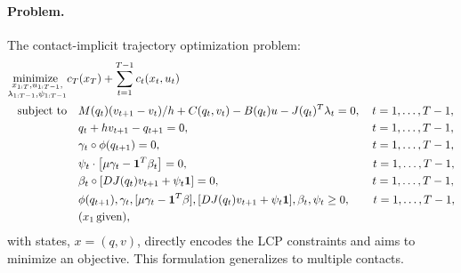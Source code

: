 \paragraph{Problem.} The contact-implicit trajectory optimization problem:
\begin{align}
	\underset{\substack{x_{1:T}, u_{1:T-1}, \\ \lambda_{1:T-1}, \psi_{1:T-1}}}{\mbox{minimize }} & c_T(x_T) + \sum \limits_{t = 1}^{T-1} c_t(x_t, u_t) \label{intro_ci_trajopt}\\
	\mbox{subject to} & \quad M(q_{t}) (v_{t+1} - v_{t}) / h + C(q_t, v_t) -B(q_{t}) u - J(q_{t})^T \lambda_t = 0, \quad t = 1,\dots,T-1, \notag \\
	& \quad q_t + h v_{t+1} - q_{t+1} = 0, \quad \quad \, \, \, \, \quad \quad \quad \quad \quad \quad \quad \quad \quad \quad \quad \quad \quad \, \, t = 1,\dots,T-1, \notag \\
	& \quad \gamma_t \circ \phi(q_{t+1}) = 0, \notag \quad \quad \quad \quad \, \, \, \, \, \, \, \quad \quad \quad \quad \quad \quad \quad \quad \quad \quad \quad \quad \quad \, \, t = 1,\dots,T-1, \notag\\
	& \quad \psi_t \cdot \left[\mu \gamma_t - \textbf{1}^T \beta_t \right] = 0, \, \, \,  \, \, \quad \quad \quad \quad \quad \quad \quad \quad \quad \quad \quad \quad \quad \quad \quad \, \, t = 1,\dots,T-1, \notag \\
	& \quad \beta_t \circ [D J(q_{t}) v_{t+1} + \psi_t \textbf{1}] = 0, \, \quad \quad \quad \quad \quad \quad \quad \quad \quad \quad \quad \quad \quad \, t = 1,\dots,T-1, \notag\\
	& \quad \phi(q_{t+1}), \gamma_t, [\mu \gamma_t - \textbf{1}^T \beta], [D J(q_{t}) v_{t+1} + \psi_t \textbf{1}], \beta_t, \psi_t \geq 0, \quad \quad t = 1,\dots,T-1, \notag \\
	& \quad (x_1 \, \mbox{given}) \notag,
\end{align}
with states, $x = (q, v)$, directly encodes the LCP constraints and aims to minimize an objective. This formulation generalizes to multiple contacts. 

